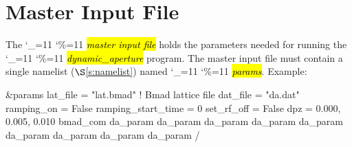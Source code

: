 \documentclass{hitec}
\newcommand\dottcmd[1]{\hl{\em#1}\endgroup}
\newcommand{\vn}{\begingroup\catcode`\_=11 \catcode`\%=11 \dottcmd}
\newcommand{\da}{\vn{dynamic_aperture}\xspace}
\newcommand{\sref}[1]{$\S$\ref{#1}}
\newcommand{\Section}[1]{\section{#1}\vspace*{-1ex}}
\begin{document}
\Section{Master Input File}
\label{s:input}

The \vn{master input file} holds the parameters needed for running the \da program. The master input
file must contain a single namelist (\sref{s:namelist}) named \vn{params}.  Example:
\begin{code}
&params
  lat_file   =  "lat.bmad"     ! Bmad lattice file
  dat_file = "da.dat"
  ramping_on = False
  ramping_start_time = 0
  set_rf_off = False
  dpz = 0.000, 0.005, 0.010
  bmad_com%
  da_param%
  da_param%
  da_param%
  da_param%
  da_param%
  da_param%
  da_param%
  da_param%
  da_param%
/
\end{code}
\end{document}
